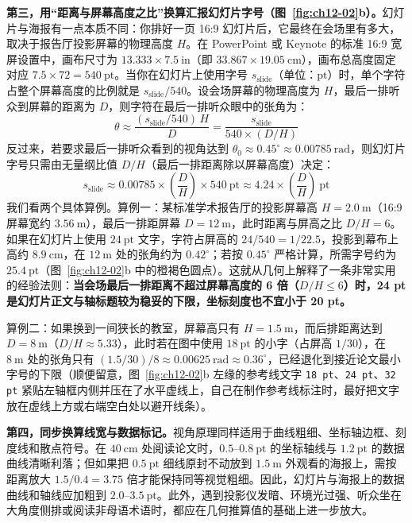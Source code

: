 \textbf{第三，用“距离与屏幕高度之比”换算汇报幻灯片字号（图~\ref{fig:ch12-02}b）。}幻灯片与海报有一点本质不同：你排好一页 16:9 幻灯片后，它最终在会场里有多大，取决于报告厅投影屏幕的物理高度 $H$。在 PowerPoint 或 Keynote 的标准 16:9 宽屏设置中，画布尺寸为 $13.333 \times 7.5\ \text{in}$（即 $33.867 \times 19.05\ \text{cm}$），画布总高度固定对应 $7.5 \times 72 = 540\ \text{pt}$。当你在幻灯片上使用字号 $s_{\text{slide}}$（单位：$\text{pt}$）时，单个字符占整个屏幕高度的比例就是 $s_{\text{slide}} / 540$。设会场屏幕的物理高度为 $H$，最后一排听众到屏幕的距离为 $D$，则字符在最后一排听众眼中的张角为：
\[
\theta \approx \frac{(s_{\text{slide}} / 540)\,H}{D} = \frac{s_{\text{slide}}}{540 \times (D/H)}
\]
反过来，若要求最后一排听众看到的视角达到 $\theta_0 \approx 0.45^\circ \approx 0.00785\ \text{rad}$，则幻灯片字号只需由无量纲比值 $D/H$（最后一排距离除以屏幕高度）决定：
\[
s_{\text{slide}} \approx 0.00785 \times \left(\frac{D}{H}\right) \times 540\ \text{pt} \approx 4.24 \times \left(\frac{D}{H}\right)\ \text{pt}
\]
我们看两个具体算例。算例一：某标准学术报告厅的投影屏幕高 $H = 2.0\ \text{m}$（16:9 屏幕宽约 $3.56\ \text{m}$），最后一排距屏幕 $D = 12\ \text{m}$，此时距离与屏高之比 $D/H = 6$。如果在幻灯片上使用 $24\ \text{pt}$ 文字，字符占屏高的 $24 / 540 = 1 / 22.5$，投影到幕布上高约 $8.9\ \text{cm}$，在 $12\ \text{m}$ 处的张角约为 $0.42^\circ$；若按 $0.45^\circ$ 严格计算，所需字号约为 $25.4\ \text{pt}$（图~\ref{fig:ch12-02}b 中的橙褐色圆点）。这就从几何上解释了一条非常实用的经验法则：\textbf{当会场最后一排距离不超过屏幕高度的 6 倍（$D/H \le 6$）时，24 pt 是幻灯片正文与轴标题较为稳妥的下限，坐标刻度也不宜小于 20 pt。}

算例二：如果换到一间狭长的教室，屏幕高只有 $H = 1.5\ \text{m}$，而后排距离达到 $D = 8\ \text{m}$（$D/H \approx 5.33$），此时若在图中使用 $18\ \text{pt}$ 的小字（占屏高 $1/30$），在 $8\ \text{m}$ 处的张角只有 $(1.5 / 30) / 8 \approx 0.00625\ \text{rad} \approx 0.36^\circ$，已经退化到接近论文最小字号的下限（顺便留意，图~\ref{fig:ch12-02}b 左缘的参考线文字 \texttt{18 pt}、\texttt{24 pt}、\texttt{32 pt} 紧贴左轴框内侧并压在了水平虚线上，自己在制作参考线标注时，最好把文字放在虚线上方或右端空白处以避开线条）。

\textbf{第四，同步换算线宽与数据标记。}视角原理同样适用于曲线粗细、坐标轴边框、刻度线和散点符号。在 $40\ \text{cm}$ 处阅读论文时，$0.5\text{--}0.8\ \text{pt}$ 的坐标轴线与 $1.2\ \text{pt}$ 的数据曲线清晰利落；但如果把 $0.5\ \text{pt}$ 细线原封不动放到 $1.5\ \text{m}$ 外观看的海报上，需按距离放大 $1.5 / 0.4 = 3.75$ 倍才能保持同等视觉粗细。因此，幻灯片与海报上的数据曲线和轴线应加粗到 $2.0\text{--}3.5\ \text{pt}$。此外，遇到投影仪发暗、环境光过强、听众坐在大角度侧排或阅读非母语术语时，都应在几何推算值的基础上进一步放大。

